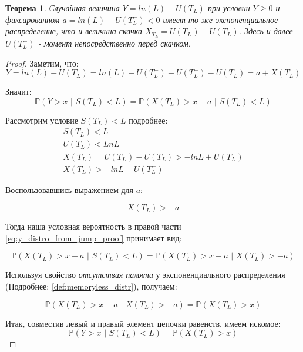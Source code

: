 \documentclass[a4paper,12pt]{article}
\newtheorem{theorem}{Теорема}
\theoremstyle{definition}
\begin{document}
\begin{theorem}
Случайная величина $Y=ln(L) - U(T_L)$ при условии $Y \ge 0$ и фиксированном $a = ln(L) - U(T_L^{-}) < 0$ имеет то же экспоненциальное распределение, что и величина скачка $X_{T_L}=U(T_L^{-})-U(T_L)$. Здесь и далее $U(T_L^{-})$ - момент непосредственно перед скачком.
\end{theorem}
\begin{proof}
Заметим, что:
\begin{equation*}
    Y = ln(L) - U(T_L) = ln(L) - U(T_L^{-}) + U(T_L^{-}) - U(T_L) = a + X(T_L)
\end{equation*}

Значит:
\begin{equation}\label{eq:y_distro_from_jump_proof}
    \mathbb{P}(Y > x \text{ | } S(T_L) < L) = \mathbb{P}(X(T_L) > x - a \text{ | } S(T_L) < L)
\end{equation}

Рассмотрим условие $S(T_L) < L$ подробнее:
\begin{gather*}
    S(T_L) < L \\
    U(T_L) < Ln L \\
    X(T_L) = U(T_L^{-}) - U(T_L) > -ln L + U(T_L^{-}) \\
    X(T_L) > - ln L + U(T_L^{-})
\end{gather*}

Воспользовавшись выражением для $a$:

\begin{equation*}
    X(T_L) > -a
\end{equation*}

Тогда наша условная вероятность в правой части \eqref{eq:y_distro_from_jump_proof} принимает вид:

\begin{equation*}
    \mathbb{P}(X(T_L) > x - a \text{ | } S(T_L) < L) = \mathbb{P}(X(T_L) > x - a \text{ | } X(T_L) > -a)
\end{equation*}

Используя свойство \textit{отсутствия памяти} у экспоненциального распределения (Подробнее: \ref{def:memoryless_distr}), получаем:

\begin{equation*}
    \mathbb{P}(X(T_L) > x - a \text{ | } X(T_L) > -a) = \mathbb{P}(X(T_L) > x)
\end{equation*}

Итак, совместив левый и правый элемент цепочки равенств, имеем искомое:
\begin{equation}\label{eq:y_distro_from_jump}
    \mathbb{P}(Y > x \text{ | } S(T_L) < L) = \mathbb{P}(X(T_L) > x)
\end{equation}

\end{proof}
\end{document}

